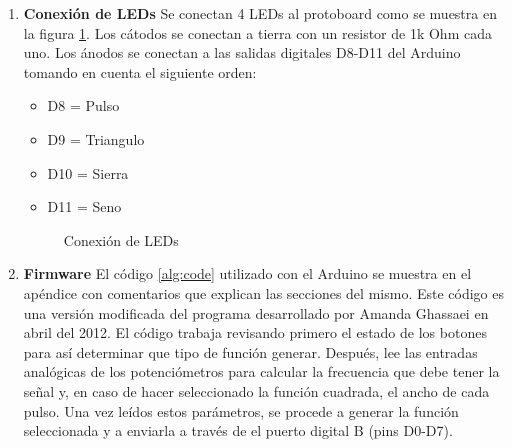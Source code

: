 \documentclass[11pt]{article}
\begin{document}
\begin{enumerate}[label=\textbf{Paso \arabic*:}]
\item \textbf{Conexión de LEDs}
Se conectan 4 LEDs al protoboard como se muestra en la figura \ref{fig:leds}. Los cátodos se conectan a tierra con un resistor de 1k Ohm cada uno. Los ánodos se conectan a las salidas digitales D8-D11 del Arduino tomando en cuenta el siguiente orden:

\begin{itemize}
\item D8 = Pulso
\item D9 = Triangulo
\item D10 = Sierra
\item D11 = Seno
\end{itemize}

\begin{figure}[H]
\centering
{}
\caption{Conexión de LEDs}
\label{fig:leds}
\end{figure}

\item \textbf{Firmware}
El código \ref{alg:code} utilizado con el Arduino se muestra en el apéndice con comentarios que explican las secciones del mismo. Este código es una versión modificada del programa desarrollado por Amanda Ghassaei en abril del 2012. 
El código trabaja revisando primero el estado de los botones para así determinar que tipo de función generar. Después, lee las entradas analógicas de los potenciómetros para calcular la frecuencia que debe tener la señal y, en caso de hacer seleccionado la función cuadrada, el ancho de cada pulso. Una vez leídos estos parámetros, se procede a generar la función seleccionada y a enviarla a través de el puerto digital B (pins D0-D7).



\end{enumerate}
\end{document}
